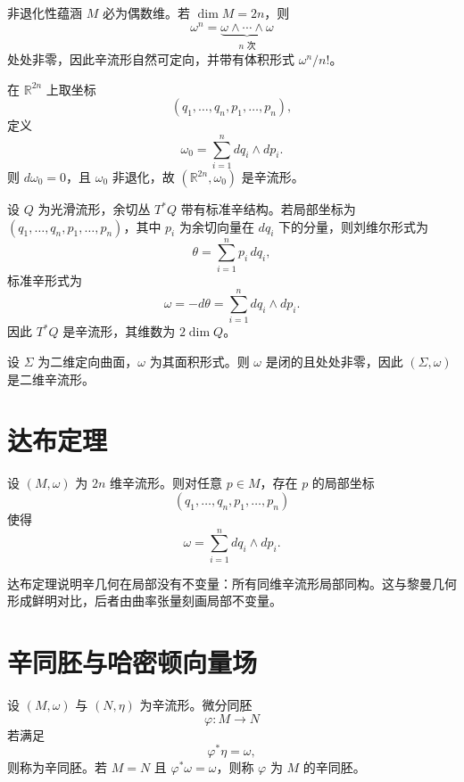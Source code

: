 非退化性蕴涵 \(M\) 必为偶数维。若 \(\dim M=2n\)，则
\[
\omega^n=\underbrace{\omega\wedge\cdots\wedge\omega}_{n\text{ 次}}
\]
处处非零，因此辛流形自然可定向，并带有体积形式 \(\omega^n/n!\)。

\begin{example}[标准辛空间]
在 \(\mathbb R^{2n}\) 上取坐标
\[
(q_1,\dots,q_n,p_1,\dots,p_n),
\]
定义
\[
\omega_0=\sum_{i=1}^n dq_i\wedge dp_i.
\]
则 \(d\omega_0=0\)，且 \(\omega_0\) 非退化，故 \((\mathbb R^{2n},\omega_0)\) 是辛流形。
\end{example}

\begin{example}[余切丛]
设 \(Q\) 为光滑流形，余切丛 \(T^*Q\) 带有标准辛结构。若局部坐标为 \((q_1,\dots,q_n,p_1,\dots,p_n)\)，其中 \(p_i\) 为余切向量在 \(dq_i\) 下的分量，则刘维尔形式为
\[
\theta=\sum_{i=1}^n p_i\,dq_i,
\]
标准辛形式为
\[
\omega=-d\theta=\sum_{i=1}^n dq_i\wedge dp_i.
\]
因此 \(T^*Q\) 是辛流形，其维数为 \(2\dim Q\)。
\end{example}

\begin{example}[定向曲面]
设 \(\Sigma\) 为二维定向曲面，\(\omega\) 为其面积形式。则 \(\omega\) 是闭的且处处非零，因此 \((\Sigma,\omega)\) 是二维辛流形。
\end{example}

\section{达布定理}

\begin{theorem}[达布定理]
设 \((M,\omega)\) 为 \(2n\) 维辛流形。则对任意 \(p\in M\)，存在 \(p\) 的局部坐标
\[
(q_1,\dots,q_n,p_1,\dots,p_n)
\]
使得
\[
\omega=\sum_{i=1}^n dq_i\wedge dp_i.
\]
\end{theorem}

达布定理说明辛几何在局部没有不变量：所有同维辛流形局部同构。这与黎曼几何形成鲜明对比，后者由曲率张量刻画局部不变量。

\section{辛同胚与哈密顿向量场}

\begin{definition}[辛同胚]
设 \((M,\omega)\) 与 \((N,\eta)\) 为辛流形。微分同胚
\[
\varphi:M\to N
\]
若满足
\[
\varphi^*\eta=\omega,
\]
则称为辛同胚。若 \(M=N\) 且 \(\varphi^*\omega=\omega\)，则称 \(\varphi\) 为 \(M\) 的辛同胚。
\end{definition}

